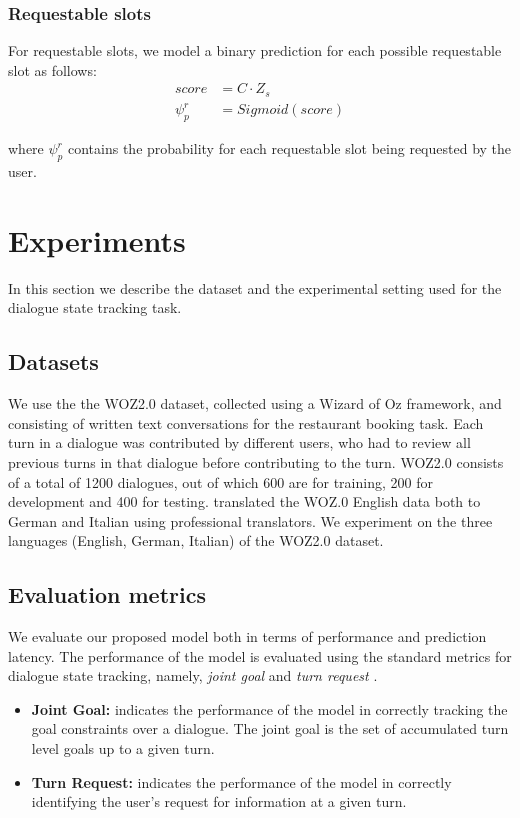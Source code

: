 \documentclass{article}
\begin{document}
\subsubsection{Requestable slots}
For requestable slots, we model a binary prediction for each possible requestable slot as follows:
\begin{align}
    score &= C \cdot Z_s \\
    \psi_p^r &= Sigmoid(score)
\end{align}

where $\psi_p^r$ contains the probability for each requestable slot being requested by the user.

\section{Experiments}
\label{sec:exp}
In this section we describe the dataset and the experimental setting used for the dialogue state tracking task.

\subsection{Datasets}
We use the the WOZ2.0 \cite{NBT} dataset, collected using a Wizard of Oz framework, and consisting of written text conversations for the restaurant booking task.
Each turn in a dialogue was contributed by different users, who had to review all previous turns in that dialogue before contributing to the turn.
WOZ2.0 consists of a total of 1200 dialogues, out of which 600 are for training, 200 for development and 400 for testing.
\cite{mrksicsemantic} translated the WOZ.0 English data both to German and Italian using professional translators.
We experiment on the three languages (English, German, Italian) of the WOZ2.0 dataset.

\subsection{Evaluation metrics}
We evaluate our proposed model both in terms of performance and prediction latency.
The performance of the model is evaluated using the standard metrics for dialogue state tracking, namely, \textit{joint goal} and \textit{turn request} \cite{DSTC2}.
\begin{itemize}
    \item \textbf{Joint Goal:} indicates the performance of the model in correctly tracking the goal constraints over a dialogue. The joint goal is the set of accumulated turn level goals up to a given turn.
    \item \textbf{Turn Request:} indicates the performance of the model in correctly identifying the user's request for information at a given turn.
\end{itemize}
\end{document}

